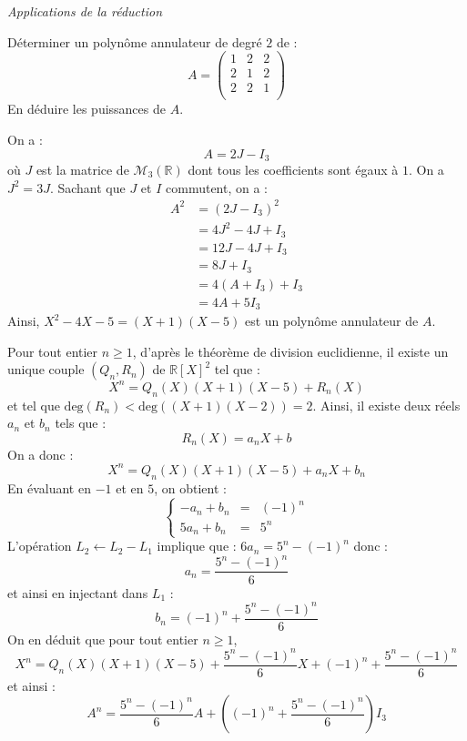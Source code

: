 \documentclass[a4paper,10pt]{report}
\begin{document}
\begin{center}
\textit{{ {\large Applications de la réduction}}}
\end{center}

\medskip

\begin{Exercice}{} Déterminer un polynôme annulateur de degré $2$ de :
$$ A = \begin{pmatrix}
1 & 2 & 2 \\
2 & 1 & 2 \\
2 & 2 & 1 \\
\end{pmatrix}$$
En déduire les puissances de $A$. 
\end{Exercice}

\corr On a :
$$ A= 2J-I_3$$
où $J$ est la matrice de $\mathcal{M}_3(\mathbb{R})$ dont tous les coefficients sont égaux à $1$. On a $J^2=3J$. Sachant que $J$ et $I$ commutent, on a :
\begin{align*}
A^2 & = (2J-I_3)^2 \\
& = 4J^2 - 4J+ I_3 \\
& = 12J-4J+I_3 \\
& = 8J+I_3 \\
& = 4(A+I_3) + I_3 \\
& = 4A +5I_3
\end{align*}
Ainsi, $X^2-4X-5=(X+1)(X-5)$ est un polynôme annulateur de $A$.

\medskip

\noindent Pour tout entier $n \geq 1$, d'après le théorème de division euclidienne, il existe un unique couple $(Q_n,R_n)$ de $\mathbb{R}[X]^2$ tel que :
$$ X^n = Q_n(X) (X+1)(X-5) + R_n(X)$$
et tel que $\textrm{deg}(R_n)<\textrm{deg}((X+1)(X-2))=2$. Ainsi, il existe deux réels $a_n$ et $b_n$ tels que :
$$ R_n(X)= a_n X + b$$
On a donc :
$$ X^n = Q_n(X) (X+1)(X-5) + a_n X + b_n$$
En évaluant en $-1$ et en $5$, on obtient :
$$ \left\lbrace \begin{array}{ccl}
-a_n + b_n & = & (-1)^n \\
5a_n + b_n & = & 5^n
\end{array}\right.$$
L'opération $L_2 \leftarrow L_2- L_1$ implique que : $6 a_n = 5^n - (-1)^n$ donc :
$$ a_n = \dfrac{5^n-(-1)^n}{6}$$
et ainsi en injectant dans $L_1$ :
$$ b_n = (-1)^n + \dfrac{5^n-(-1)^n}{6}$$
On en déduit que pour tout entier $n \geq 1$,
$$ X^n = Q_n(X) (X+1)(X-5) +\dfrac{5^n-(-1)^n}{6}  X + (-1)^n + \dfrac{5^n-(-1)^n}{6}$$
et ainsi :
$$ A^n = \dfrac{5^n-(-1)^n}{6}  A + \left((-1)^n + \dfrac{5^n-(-1)^n}{6}\right) I_3$$
\end{document}

